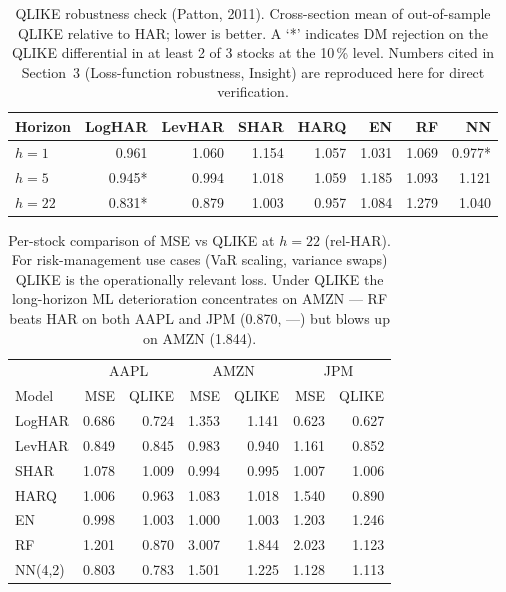 \documentclass[twocolumn,9pt]{extarticle}
\begin{document}
\begin{table}[H]
\centering\small
\caption{QLIKE robustness check (Patton, 2011). Cross-section mean
of out-of-sample QLIKE relative to HAR; lower is better. A `*'
indicates DM rejection on the QLIKE differential in at least 2 of 3
stocks at the 10\,\% level. Numbers cited in Section~3
(Loss-function robustness, Insight) are reproduced here for direct
verification.}
\label{tab:qlike}
\begin{tabular}{lrrrrrrr}
\toprule
Horizon & LogHAR & LevHAR & SHAR & HARQ & EN & RF & NN \\
\midrule
$h=1$   & 0.961   & 1.060 & 1.154 & 1.057 & 1.031 & 1.069 & 0.977* \\
$h=5$   & 0.945*  & 0.994 & 1.018 & 1.059 & 1.185 & 1.093 & 1.121  \\
$h=22$  & 0.831*  & 0.879 & 1.003 & 0.957 & 1.084 & 1.279 & 1.040  \\
\bottomrule
\end{tabular}
\end{table}

\renewcommand{\thetable}{3b}
\addtocounter{table}{-1}
\begin{table}[H]
\centering\small
\caption{Per-stock comparison of MSE vs QLIKE at $h=22$ (rel-HAR).
For risk-management use cases (VaR scaling, variance swaps) QLIKE is
the operationally relevant loss. Under QLIKE the long-horizon ML
deterioration concentrates on AMZN — RF beats HAR on both AAPL and
JPM (0.870, ---) but blows up on AMZN (1.844).}
\label{tab:per-stock-qlike}
\begin{tabular}{l|rr|rr|rr}
\toprule
       & \multicolumn{2}{c|}{AAPL} & \multicolumn{2}{c|}{AMZN}
       & \multicolumn{2}{c}{JPM} \\
Model  & MSE & QLIKE & MSE & QLIKE & MSE & QLIKE \\
\midrule
LogHAR        & 0.686 & 0.724 & 1.353 & 1.141 & 0.623 & 0.627 \\
LevHAR        & 0.849 & 0.845 & 0.983 & 0.940 & 1.161 & 0.852 \\
SHAR          & 1.078 & 1.009 & 0.994 & 0.995 & 1.007 & 1.006 \\
HARQ          & 1.006 & 0.963 & 1.083 & 1.018 & 1.540 & 0.890 \\
EN            & 0.998 & 1.003 & 1.000 & 1.003 & 1.203 & 1.246 \\
RF            & 1.201 & 0.870 & 3.007 & 1.844 & 2.023 & 1.123 \\
NN(4,2)       & 0.803 & 0.783 & 1.501 & 1.225 & 1.128 & 1.113 \\
\bottomrule
\end{tabular}
\end{table}
\renewcommand{\thetable}{\arabic{table}}
\end{document}
